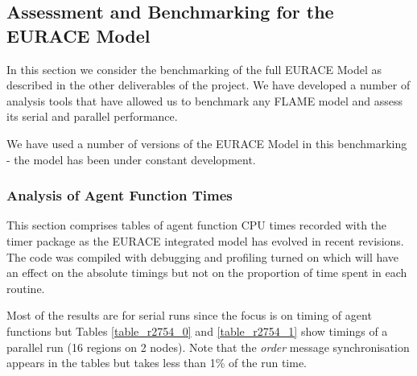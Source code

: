 \subsection{Assessment and Benchmarking for the EURACE Model}
\label{sec:benchmarks}
In this section we consider the benchmarking of the full EURACE Model as
described in the other deliverables of the project. We have developed a
number of analysis tools that have allowed us to benchmark any
FLAME model and assess its serial and parallel performance.

We have used a number of versions of the EURACE Model in this benchmarking - the model
has been under constant development.

\subsubsection{Analysis of Agent Function Times}

This section comprises tables of agent function CPU times recorded with the timer package as the EURACE integrated model has evolved in recent revisions. The code was compiled with debugging and profiling turned on which will have an effect on the absolute timings but not on the proportion of time spent in each routine. 

Most of the results are for serial runs since the focus is on timing of agent functions but Tables \ref{table_r2754_0} and \ref{table_r2754_1} show timings of a parallel run (16 regions on 2 nodes). Note that the \textit{order} message synchronisation appears in the tables but takes less than 1\% of the run time.

